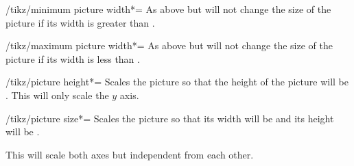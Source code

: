 \begin{multicols}{2}
\begin{key}{/tikz/minimum picture width*=}
  As above but will not change the size of the picture
  if its width is greater than .
\end{key}

\begin{key}{/tikz/maximum picture width*=}
  As above but will not change the size of the picture
  if its width is less than .
\end{key}

\begin{key}{/tikz/picture height*=}
  Scales the picture so that the height of the picture will be .
  This will only scale the $y$ axis.
\end{key}

\begin{key}{/tikz/picture size*=}
  Scales the picture so that its width will be 
  and its height will be .
  
  This will scale both axes but independent from each other.
\end{key}
\end{multicols}